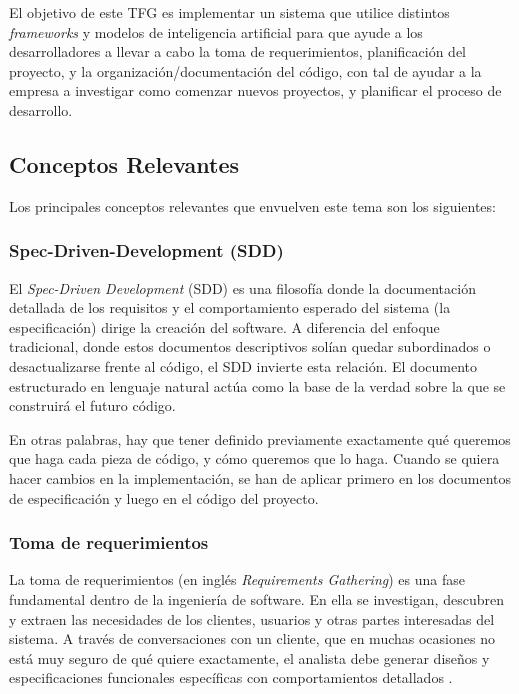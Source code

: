 \documentclass[11pt, letterpaper]{article}
\begin{document}
El objetivo de este TFG es implementar un sistema que utilice distintos \textit{frameworks} y modelos de inteligencia artificial para que ayude a los desarrolladores a llevar a cabo la toma de requerimientos, planificación del proyecto, y la organización/documentación del código, con tal de ayudar a la empresa a investigar como comenzar nuevos proyectos, y planificar el proceso de desarrollo. 

\subsection{Conceptos Relevantes}
Los principales conceptos relevantes que envuelven este tema son los siguientes:

\subsubsection{Spec-Driven-Development (SDD)}

El \textit{Spec-Driven Development} (SDD) es una filosofía donde la documentación detallada de los requisitos y el comportamiento esperado del sistema (la especificación) dirige la creación del software. A diferencia del enfoque tradicional, donde estos documentos descriptivos solían quedar subordinados o desactualizarse frente al código, el SDD invierte esta relación. El documento estructurado en lenguaje natural actúa como la base de la verdad sobre la que se construirá el futuro código. \cite{ostroff_agile_2004} \cite{github_spec_kit}

En otras palabras, hay que tener definido previamente exactamente qué queremos que haga cada pieza de código, y cómo queremos que lo haga. Cuando se quiera hacer cambios en la implementación, se han de aplicar primero en los documentos de especificación y luego en el código del proyecto. \\

\subsubsection{Toma de requerimientos}

La toma de requerimientos (en inglés \textit{Requirements Gathering}) es una fase fundamental dentro de la ingeniería de software. En ella se investigan, descubren y extraen las necesidades de los clientes, usuarios y otras partes interesadas del sistema. A través de conversaciones con un cliente, que en muchas ocasiones no está muy seguro de qué quiere exactamente, el analista debe generar diseños y especificaciones funcionales específicas con comportamientos detallados \cite{jama_requirements} \cite{sommerville_se_2015}.
\end{document}
